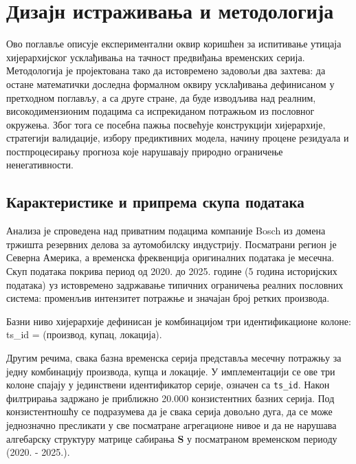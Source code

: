 \documentclass[12pt,oneside]{memoir}
\begin{document}
\chapter{Дизајн истраживања и методологија}
\label{chp:metodologija}

Ово поглавље описује експериментални оквир коришћен за испитивање утицаја хијерархијског усклађивања на тачност предвиђања временских серија. Методологија је пројектована тако да истовремено задовољи два захтева:  да остане математички доследна формалном оквиру усклађивања дефинисаном у претходном поглављу, а са друге стране, да буде изводљива над реалним, високодимензионим подацима са испрекиданом потражњом из пословног окружења. Због тога се посебна пажња посвећује конструкцији хијерархије, стратегији валидације, избору предиктивних модела, начину процене резидуала и постпроцесирању прогноза које нарушавају природно ограничење ненегативности.

\section{Карактеристике и припрема скупа података}

Анализа је спроведена над приватним подацима компаније Bosch из домена тржишта резервних делова за аутомобилску индустрију. Посматрани регион је Северна Америка, а временска фреквенција оригиналних података је месечна. Скуп података покрива период од 2020. до 2025. године (5 година историјских података) уз истовремено задржавање типичних ограничења реалних пословних система: променљив интензитет потражње и значајан број ретких производа.

Базни ниво хијерархије дефинисан је комбинацијом три идентификационе колоне:
{ts\_id} = (производ, купац, локација).

Другим речима, свака базна временска серија представља месечну потражњу за једну комбинацију производа, купца и локације. У имплементацији се ове три колоне спајају у јединствени идентификатор серије, означен са \texttt{ts\_id}. Након филтрирања задржано је приближно 20.000 конзистентних базних серија. Под конзистентношћу се подразумева да је свака серија довољно дуга, да се може једнозначно пресликати у све посматране агрегационе нивое и да не нарушава алгебарску структуру матрице сабирања $\mathbf{S}$ у посматраном временском периоду (2020. - 2025.).
\end{document}
